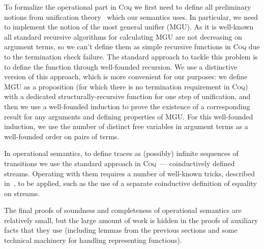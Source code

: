 To formalize the operational part in \textsc{Coq} we first need to define all preliminary notions from unification theory~\cite{Unification} which our semantics uses. In particular, we need to implement the notion of the most general unifier (MGU). As it is well-known~\cite{StructuralMGU} all standard recursive algorithms for calculating MGU are not decreasing on argument terms, so we can't define them as simple recursive functions in \textsc{Coq} due to the termination check failure. The standard approach to tackle this problem is to define the function through well-founded recursion. We use a distinctive version of this approach, which is more convenient for our purposes: we define MGU as a proposition (for which there is no termination requirement in \textsc{Coq}) with a dedicated structurally-recursive function for one step of unification, and then we use a well-founded induction to prove the existence of a corresponding result for any arguments and defining properties of MGU. For this well-founded induction, we use the number of distinct free variables in argument terms as a well-founded order on pairs of terms.

In operational semantics, to define traces as (possibly) infinite sequences of transitions we use the standard approach in \textsc{Coq}~--- coinductively defined streams. Operating with them requires a number of well-known tricks, described in~\cite{CPDT}, to be applied, such as the use of a separate coinductive definition of equality on streams.

The final proofs of soundness and completeness of operational semantics are relatively small, but the large amount of work is hidden in the proofs of auxiliary facts that they use (including lemmas from the previous sections and some technical machinery for handling representing functions).
